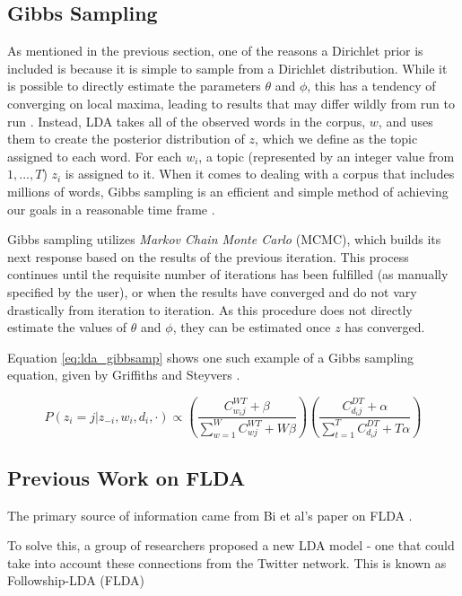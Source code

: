 \documentclass[a4paper]{article}
\begin{document}
\subsection{Gibbs Sampling}
As mentioned in the previous section, one of the reasons a Dirichlet prior is included is because it is simple to sample from a Dirichlet distribution. While it is possible to directly estimate the parameters $\theta$ and $\phi$, this has a tendency of converging on local maxima, leading to results that may differ wildly from run to run \cite{hoffman}. Instead, LDA takes all of the observed words in the corpus, $w$, and uses them to create the posterior distribution of $z$, which we define as the topic assigned to each word. For each $w_i$, a topic (represented by an integer value from $1, ..., T$) $z_i$ is assigned to it. When it comes to dealing with a corpus that includes millions of words, Gibbs sampling is an efficient and simple method of achieving our goals in a reasonable time frame \cite{lda}.

Gibbs sampling utilizes \textit{Markov Chain Monte Carlo} (MCMC), which builds its next response based on the results of the previous iteration. This process continues until the requisite number of iterations has been fulfilled (as manually specified by the user), or when the results have converged and do not vary drastically from iteration to iteration. As this procedure does not directly estimate the values of $\theta$ and $\phi$, they can be estimated once $z$ has converged.

Equation \ref{eq:lda_gibbsamp} shows one such example of a Gibbs sampling equation, given by Griffiths and Steyvers \cite{griff}.

\begin{equation}\label{eq:lda_gibbsamp}
  P(z_i = j | z_{-i}, w_i, d_i, \cdot) \propto
    (\frac{C_{w_ij}^{WT} + \beta}
    {\sum\limits^W_{w = 1} C_{wj}^{WT} + W\beta})
    (\frac{C_{d_ij}^{DT} + \alpha}
    {\sum\limits^T_{t = 1} C_{d_ij}^{DT} + T\alpha})
\end{equation}

\cite{lda}

\subsection{Previous Work on FLDA}
The primary source of information came from Bi et al's paper on FLDA \cite{flda}. 

To solve this, a group of researchers proposed a new LDA model - one that could take into account these connections from the Twitter network. This is known as Followship-LDA (FLDA)
\end{document}
